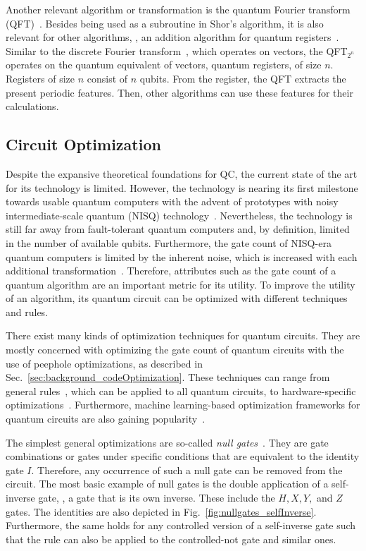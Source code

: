 Another relevant algorithm or transformation is the quantum Fourier transform (QFT)~\cite{Copp02}. Besides being used as a subroutine in Shor's algorithm, it is also relevant for other algorithms, \eg, an addition algorithm for quantum registers~\cite{Drap00}. Similar to the discrete Fourier transform~\cite{Wino78}, which operates on vectors, the QFT$_{2^n}$ operates on the quantum equivalent of vectors, quantum registers, of size $n$. Registers of size $n$ consist of $n$ qubits. From the register, the QFT extracts the present periodic features. Then, other algorithms can use these features for their calculations.

\subsection{Circuit Optimization}
\label{sec:background_circuitOptimization}
Despite the expansive theoretical foundations for QC, the current state of the art for its technology is limited. However, the technology is nearing its first milestone towards usable quantum computers with the advent of prototypes with noisy intermediate-scale quantum (NISQ) technology~\cite{BFA22}. Nevertheless, the technology is still far away from fault-tolerant quantum computers and, by definition, limited in the number of available qubits. Furthermore, the gate count of NISQ-era quantum computers is limited by the inherent noise, which is increased with each additional transformation~\cite{Pres18}. Therefore, attributes such as the gate count of a quantum algorithm are an important metric for its utility. To improve the utility of an algorithm, its quantum circuit can be optimized with different techniques and rules.

There exist many kinds of optimization techniques for quantum circuits. They are mostly concerned with optimizing the gate count of quantum circuits with the use of peephole optimizations, as described in Sec.~\ref{sec:background_codeOptimization}. These techniques can range from general rules~\cite{GaCh11, LBZ21}, which can be applied to all quantum circuits, to hardware-specific optimizations~\cite{KMO*23}. Furthermore, machine learning-based optimization frameworks for quantum circuits are also gaining popularity~\cite{FNML21,LPM*24, RLB*24}.

The simplest general optimizations are so-called \emph{null gates}~\cite{GaCh11}. They are gate combinations or gates under specific conditions that are equivalent to the identity gate $I$. Therefore, any occurrence of such a null gate can be removed from the circuit. The most basic example of null gates is the double application of a self-inverse gate, \ie, a gate that is its own inverse. These include the $H, X, Y,$ and $Z$ gates. The identities are also depicted in Fig.~\ref{fig:nullgates_selfInverse}.
Furthermore, the same holds for any controlled version of a self-inverse gate such that the rule can also be applied to the controlled-not gate and similar ones. 

